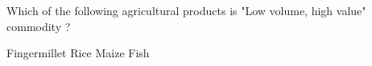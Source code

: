 \begin{questions}
\question Which of the following agricultural products is "Low volume, high value" commodity ?
\begin{choices}
\choice Fingermillet
\choice Rice
\choice Maize
\CorrectChoice Fish
\end{choices}

\question
\begin{choices}
\CorrectChoice
\choice
\choice
\choice
\end{choices}

\question
\begin{choices}
\CorrectChoice
\choice
\choice
\choice
\end{choices}

\question
\begin{choices}
\CorrectChoice
\choice
\choice
\choice
\end{choices}

\question
\begin{choices}
\CorrectChoice
\choice
\choice
\choice
\end{choices}

\question
\begin{choices}
\CorrectChoice
\choice
\choice
\choice
\end{choices}

\question
\begin{choices}
\CorrectChoice
\choice
\choice
\choice
\end{choices}

\question
\begin{choices}
\CorrectChoice
\choice
\choice
\choice
\end{choices}

\question
\begin{choices}
\CorrectChoice
\choice
\choice
\choice
\end{choices}

\question
\begin{choices}
\CorrectChoice
\choice
\choice
\choice
\end{choices}

\question
\begin{choices}
\CorrectChoice
\choice
\choice
\choice
\end{choices}

\question
\begin{choices}
\CorrectChoice
\choice
\choice
\choice
\end{choices}

\question
\begin{choices}
\CorrectChoice
\choice
\choice
\choice
\end{choices}


\end{questions}
